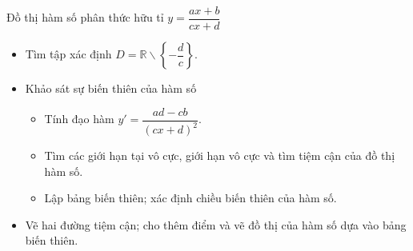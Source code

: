 \begin{dang}{Đồ thị hàm số phân thức hữu tỉ $y=\dfrac{ax+b}{cx+d}$}
	\begin{itemize}
		\item[\iconCH]  Tìm tập xác định $D=\mathbb{R}\backslash \left\{-\dfrac{d}{c}\right\}$.
		\item [\iconCH]  Khảo sát sự biến thiên của hàm số
		\begin{itemize}
			\item Tính đạo hàm $y'=\dfrac{ad-cb}{(cx+d)^2}$.
			\item Tìm các giới hạn tại vô cực, giới hạn vô cực và tìm tiệm cận của đồ thị hàm số.
			\item Lập bảng biến thiên; xác định chiều biến thiên của hàm số.
		\end{itemize}
		\item [\iconCH]  Vẽ hai đường tiệm cận; cho thêm điểm và vẽ đồ thị của hàm số dựa vào bảng biến thiên.
	\end{itemize}
\end{dang}
